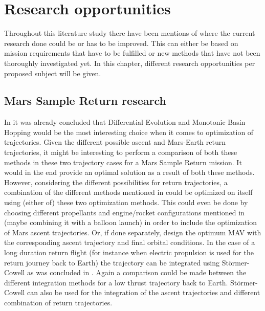 \chapter{Research opportunities}
\label{ch:research}
Throughout this literature study there have been mentions of where the current research done could be or has to be improved. This can either be based on mission requirements that have to be fulfilled or new methods that have not been thoroughly investigated yet. In this chapter, different research opportunities per proposed subject will be given. 


\section{Mars Sample Return research}
\label{sec:msrreop}
In  it was already concluded that Differential Evolution and Monotonic Basin Hopping would be the most interesting choice when it comes to optimization of trajectories. Given the different possible ascent and Mars-Earth return trajectories, it might be interesting to perform a comparison of both these methods in these two trajectory cases for a Mars Sample Return mission. It would in the end provide an optimal solution as a result of both these methods. However, considering the different possibilities for return trajectories, a combination of the different methods mentioned in  could be optimized on itself using (either of) these two optimization methods. This could even be done by choosing different propellants and engine/rocket configurations mentioned in  (maybe combining it with a balloon launch) in order to include the optimization of Mars ascent trajectories. Or, if done separately, design the optimum \ac{MAV} with the corresponding ascent trajectory and final orbital conditions. In the case of a long duration return flight (for instance when electric propulsion is used for the return journey back to Earth) the trajectory can be integrated using St\"{o}rmer-Cowell as was concluded in . Again a comparison could be made between the different integration methods for a low thrust trajectory back to Earth. 
St\"{o}rmer-Cowell can also be used for the integration of the ascent trajectories and different combination of return trajectories. 


